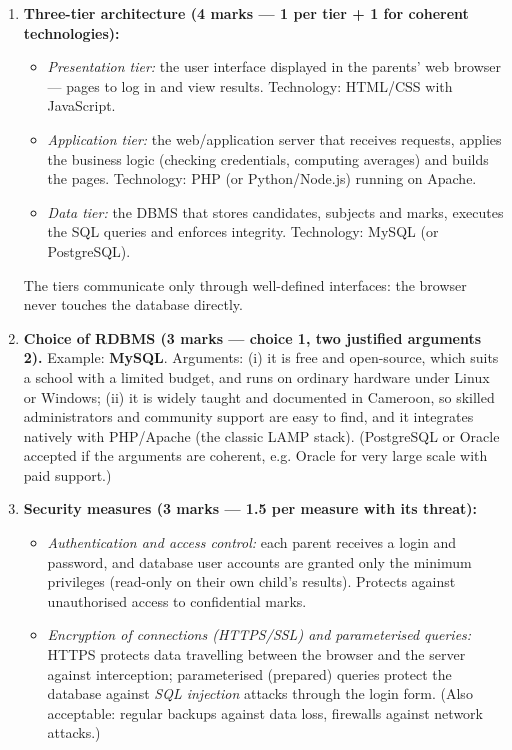 \documentclass[11pt]{article}
\begin{document}
\begin{corrige}
\begin{enumerate}
\item \textbf{Three-tier architecture (4 marks — 1 per tier + 1 for coherent technologies):}
\begin{itemize}
\item \emph{Presentation tier:} the user interface displayed in the parents' web browser — pages to log in and view results. Technology: HTML/CSS with JavaScript.
\item \emph{Application tier:} the web/application server that receives requests, applies the business logic (checking credentials, computing averages) and builds the pages. Technology: PHP (or Python/Node.js) running on Apache.
\item \emph{Data tier:} the DBMS that stores candidates, subjects and marks, executes the SQL queries and enforces integrity. Technology: MySQL (or PostgreSQL).
\end{itemize}
The tiers communicate only through well-defined interfaces: the browser never touches the database directly.
\item \textbf{Choice of RDBMS (3 marks — choice 1, two justified arguments 2).} Example: \textbf{MySQL}. Arguments: (i) it is free and open-source, which suits a school with a limited budget, and runs on ordinary hardware under Linux or Windows; (ii) it is widely taught and documented in Cameroon, so skilled administrators and community support are easy to find, and it integrates natively with PHP/Apache (the classic LAMP stack). (PostgreSQL or Oracle accepted if the arguments are coherent, e.g. Oracle for very large scale with paid support.)
\item \textbf{Security measures (3 marks — 1.5 per measure with its threat):}
\begin{itemize}
\item \emph{Authentication and access control:} each parent receives a login and password, and database user accounts are granted only the minimum privileges (read-only on their own child's results). Protects against unauthorised access to confidential marks.
\item \emph{Encryption of connections (HTTPS/SSL) and parameterised queries:} HTTPS protects data travelling between the browser and the server against interception; parameterised (prepared) queries protect the database against \emph{SQL injection} attacks through the login form. (Also acceptable: regular backups against data loss, firewalls against network attacks.)

\end{itemize}
\end{enumerate}
\end{corrige}
\end{document}
